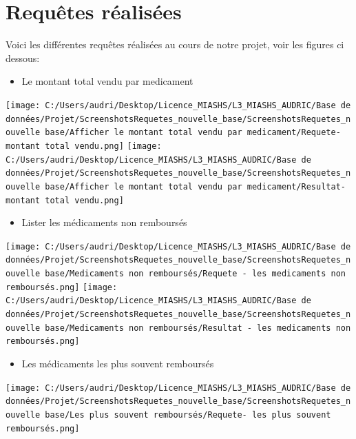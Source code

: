 \documentclass[mstat,12pt]{unswthesis}
\begin{document}
\hypertarget{requuxeates-ruxe9alisuxe9es}{%
\section{Requêtes réalisées}\label{requuxeates-ruxe9alisuxe9es}}

Voici les différentes requêtes réalisées au cours de notre projet, voir
les figures ci dessous:

\begin{itemize}
\tightlist
\item
  Le montant total vendu par medicament
\end{itemize}

\texttt{[image: C:/Users/audri/Desktop/Licence\_MIASHS/L3\_MIASHS\_AUDRIC/Base de données/Projet/ScreenshotsRequetes\_nouvelle\_base/ScreenshotsRequetes\_nouvelle base/Afficher le montant total vendu par medicament/Requete- montant total vendu.png]}
\bigskip
\texttt{[image: C:/Users/audri/Desktop/Licence\_MIASHS/L3\_MIASHS\_AUDRIC/Base de données/Projet/ScreenshotsRequetes\_nouvelle\_base/ScreenshotsRequetes\_nouvelle base/Afficher le montant total vendu par medicament/Resultat- montant total vendu.png]}

\bigskip

\begin{itemize}
\tightlist
\item
  Lister les médicaments non remboursés
\end{itemize}

\texttt{[image: C:/Users/audri/Desktop/Licence\_MIASHS/L3\_MIASHS\_AUDRIC/Base de données/Projet/ScreenshotsRequetes\_nouvelle\_base/ScreenshotsRequetes\_nouvelle base/Medicaments non remboursés/Requete - les medicaments non remboursés.png]}\hspace*{2cm}
\texttt{[image: C:/Users/audri/Desktop/Licence\_MIASHS/L3\_MIASHS\_AUDRIC/Base de données/Projet/ScreenshotsRequetes\_nouvelle\_base/ScreenshotsRequetes\_nouvelle base/Medicaments non remboursés/Resultat - les medicaments non remboursés.png]}

\begin{itemize}
\tightlist
\item
  Les médicaments les plus souvent remboursés
\end{itemize}

\texttt{[image: C:/Users/audri/Desktop/Licence\_MIASHS/L3\_MIASHS\_AUDRIC/Base de données/Projet/ScreenshotsRequetes\_nouvelle\_base/ScreenshotsRequetes\_nouvelle base/Les plus souvent remboursés/Requete- les plus souvent remboursés.png]}
\bigskip
\end{document}
